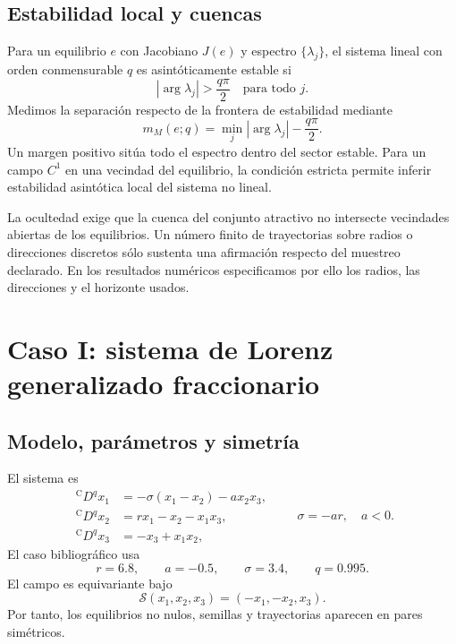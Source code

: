 \subsection{Estabilidad local y cuencas}

Para un equilibrio \(e\) con Jacobiano \(J(e)\) y espectro
\(\{\lambda_j\}\), el sistema lineal con orden conmensurable \(q\) es
asintóticamente estable si
\begin{equation}
 |\arg\lambda_j|>\frac{q\pi}{2}
 \quad\text{para todo }j.
 \label{nc:eq:matignon}
\end{equation}
Medimos la separación respecto de la frontera de estabilidad mediante
\begin{equation}
 m_M(e;q)=\min_j|\arg\lambda_j|-\frac{q\pi}{2}.
 \label{nc:eq:margin}
\end{equation}
Un margen positivo sitúa todo el espectro dentro del sector estable. Para
un campo \(C^1\) en una vecindad del equilibrio, la condición estricta
permite inferir estabilidad asintótica local del sistema no lineal.

La ocultedad exige que la cuenca del conjunto atractivo no intersecte
vecindades abiertas de los equilibrios. Un número finito de trayectorias sobre
radios o direcciones discretos sólo sustenta una afirmación respecto del
muestreo declarado. En los resultados numéricos especificamos por ello los
radios, las direcciones y el horizonte usados.

\clearpage
\section[Caso I: Lorenz generalizado fraccionario]
{Caso I: sistema de Lorenz generalizado fraccionario}

\subsection{Modelo, parámetros y simetría}

El sistema es
\begin{equation}
\begin{aligned}
 {}^{\mathrm C}D^qx_1&=-\sigma(x_1-x_2)-a x_2x_3,\\
 {}^{\mathrm C}D^qx_2&=r x_1-x_2-x_1x_3,\\
 {}^{\mathrm C}D^qx_3&=-x_3+x_1x_2,
\end{aligned}
 \qquad \sigma=-ar,\quad a<0.
\label{nc:eq:lorenz-model}
\end{equation}
El caso bibliográfico usa
\begin{equation}
 r=6.8,\qquad a=-0.5,\qquad \sigma=3.4,
 \qquad q=0.995.
 \label{nc:eq:lorenz-parameters}
\end{equation}
El campo es equivariante bajo
\begin{equation}
 \mathcal S(x_1,x_2,x_3)=(-x_1,-x_2,x_3).
 \label{nc:eq:lorenz-symmetry}
\end{equation}
Por tanto, los equilibrios no nulos, semillas y trayectorias aparecen en pares
simétricos.

